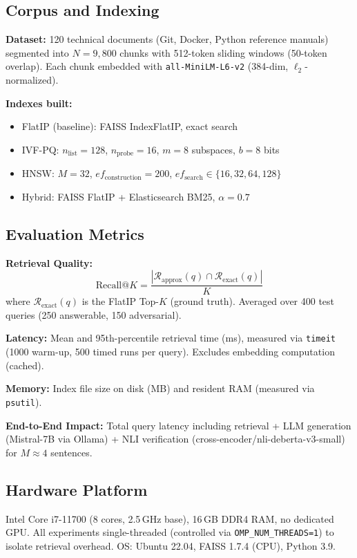 \documentclass[conference]{IEEEtran}
\begin{document}
\subsection{Corpus and Indexing}
\textbf{Dataset:} 120 technical documents (Git, Docker, Python reference manuals) segmented into $N{=}9{,}800$ chunks with 512-token sliding windows (50-token overlap). Each chunk embedded with \texttt{all-MiniLM-L6-v2} (384-dim, $\ell_2$-normalized).

\textbf{Indexes built:}
\begin{itemize}
\item FlatIP (baseline): FAISS IndexFlatIP, exact search
\item IVF-PQ: $n_{\mathrm{list}}{=}128$, $n_{\mathrm{probe}}{=}16$, $m{=}8$ subspaces, $b{=}8$ bits
\item HNSW: $M{=}32$, $ef_{\mathrm{construction}}{=}200$, $ef_{\mathrm{search}} \in \{16, 32, 64, 128\}$
\item Hybrid: FAISS FlatIP + Elasticsearch BM25, $\alpha{=}0.7$
\end{itemize}

\subsection{Evaluation Metrics}
\textbf{Retrieval Quality:}
\begin{equation}
\mathrm{Recall@}K = \frac{|\mathcal{R}_{\mathrm{approx}}(q) \cap \mathcal{R}_{\mathrm{exact}}(q)|}{K}
\label{eq:recall}
\end{equation}
where $\mathcal{R}_{\mathrm{exact}}(q)$ is the FlatIP Top-$K$ (ground truth). Averaged over 400 test queries (250 answerable, 150 adversarial).

\textbf{Latency:} Mean and 95th-percentile retrieval time (ms), measured via \texttt{timeit} (1000 warm-up, 500 timed runs per query). Excludes embedding computation (cached).

\textbf{Memory:} Index file size on disk (MB) and resident RAM (measured via \texttt{psutil}).

\textbf{End-to-End Impact:} Total query latency including retrieval + LLM generation (Mistral-7B via Ollama) + NLI verification (cross-encoder/nli-deberta-v3-small) for $M{\approx}4$ sentences.

\subsection{Hardware Platform}
Intel Core i7-11700 (8 cores, 2.5\,GHz base), 16\,GB DDR4 RAM, no dedicated GPU. All experiments single-threaded (controlled via \texttt{OMP\_NUM\_THREADS=1}) to isolate retrieval overhead. OS: Ubuntu 22.04, FAISS 1.7.4 (CPU), Python 3.9.
\end{document}
